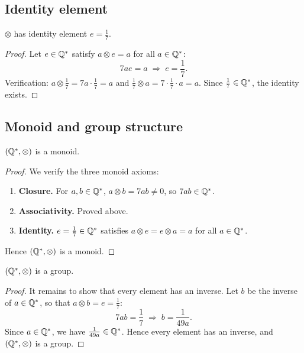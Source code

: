 \subsection{Identity element}

\begin{proposition}
$\otimes$ has identity element $e = \tfrac{1}{7}$.
\end{proposition}
\begin{proof}
Let $e \in \mathbb{Q}^{*}$ satisfy $a \otimes e = a$ for all $a \in \mathbb{Q}^{*}$:
\[
    7ae = a \;\Longrightarrow\; e = \frac{1}{7}.
\]
Verification: $a \otimes \tfrac{1}{7} = 7a \cdot \tfrac{1}{7} = a$ and
$\tfrac{1}{7} \otimes a = 7 \cdot \tfrac{1}{7} \cdot a = a$.
Since $\tfrac{1}{7} \in \mathbb{Q}^{*}$, the identity exists.
\end{proof}

\subsection{Monoid and group structure}

\begin{proposition}
$(\mathbb{Q}^{*}, \otimes)$ is a monoid.
\end{proposition}
\begin{proof}
We verify the three monoid axioms:
\begin{enumerate}[label=\arabic*.]
    \item \textbf{Closure.} For $a, b \in \mathbb{Q}^{*}$, $a \otimes b = 7ab \neq 0$,
          so $7ab \in \mathbb{Q}^{*}$.
    \item \textbf{Associativity.} Proved above.
    \item \textbf{Identity.} $e = \tfrac{1}{7} \in \mathbb{Q}^{*}$ satisfies
          $a \otimes e = e \otimes a = a$ for all $a \in \mathbb{Q}^{*}$.
\end{enumerate}
Hence $(\mathbb{Q}^{*}, \otimes)$ is a monoid.
\end{proof}

\begin{proposition}
$(\mathbb{Q}^{*}, \otimes)$ is a group.
\end{proposition}
\begin{proof}
It remains to show that every element has an inverse. Let $b$ be the inverse
of $a \in \mathbb{Q}^{*}$, so that $a \otimes b = e = \tfrac{1}{7}$:
\[
    7ab = \frac{1}{7} \;\Longrightarrow\; b = \frac{1}{49a}.
\]
Since $a \in \mathbb{Q}^{*}$, we have $\tfrac{1}{49a} \in \mathbb{Q}^{*}$. Hence every element
has an inverse, and $(\mathbb{Q}^{*}, \otimes)$ is a group.
\end{proof}

